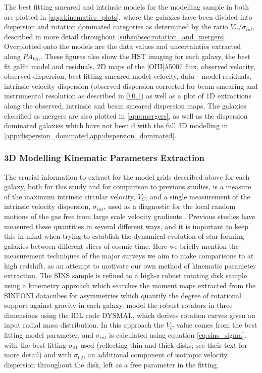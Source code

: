 \documentclass[fleqn,usenatbib]{mn2e}
\begin{document}
The best fitting smeared and intrinsic models for the modelling sample in both are plotted in \cref{app:kinematics_plots}, where the galaxies have been divided into dispersion and rotation dominated categories as determined by the ratio $V_{C}/\sigma_{int}$, described in more detail throughout \cref{subsubsec:rotation_and_mergers}.
Overplotted onto the models are the data values and uncertainties extracted along $PA_{kin}$.
These figures also show the HST imaging for each galaxy, the best fit galfit model and residuals, 2D maps of the [OIII]$\lambda$5007 flux, observed velocity, observed dispersion, best fitting smeared model velocity, data - model residuals, intrinsic velocity dispersion (observed dispersion corrected for beam smearing and instrumental resolution as described in \cref{subsubsec:param_extraction}) as well as a plot of 1D extractions along the observed, intrinsic and beam smeared dispersion maps.
The galaxies classified as mergers are also plotted in \cref{app:mergers}, as well as the dispersion dominated galaxies which have not been d with the full 3D modelling in \cref{app:dispersion_dominated,app:dispersion_dominated}.

\subsubsection{3D Modelling Kinematic Parameters Extraction}\label{subsubsec:param_extraction}
The crucial information to extract for the model grids described above for each galaxy, both for this study and for comparison to previous studies, is a measure of the maximum intrinsic circular velocity, $V_{C}$, and a single measurement of the intrinsic velocity dispersion, $\sigma_{int}$, used as a diagnostic for the local random motions of the gas free from large scale velocity gradients \citep[e.g.]{ForsterSchreiber2006,Genzel2008,Gnerucci2011}.
Previous studies have measured these quantities in several different ways, and it is important to keep this in mind when trying to establish the dynamical evolution of star forming galaxies between different slices of cosmic time.
Here we briefly mention the measurement techniques of the major surveys we aim to make comparisons to at high redshift, as an attempt to motivate our own method of kinematic parameter extraction.
The SINS sample \citep{ForsterSchreiber2009} is refined to a high-z robust rotating disk sample \citep{Cresci2009} using a kinemetry approach \citep{Krajnovic2006,Shapiro2008} which searches the moment maps extracted from the SINFONI datacubes for asymmetries which quantify the degree of rotational support against gravity in each galaxy.
\cite{Cresci2009} model the robust rotators in three dimensions using the IDL code DYSMAL, which derives rotation curves given an input radial mass distribution.
In this approach the $V_{C}$ value comes from the best fitting model parameter, and $\sigma_{int}$ is calculated using equation \ref{eq:sins_sigma}, with the best fitting $\sigma_{01}$ used (reflecting thin and thick disks; see their text for more detail) and with $\sigma_{02}$, an additional component of isotropic velocity dispersion throughout the disk, left as a free parameter in the fitting.
\end{document}

